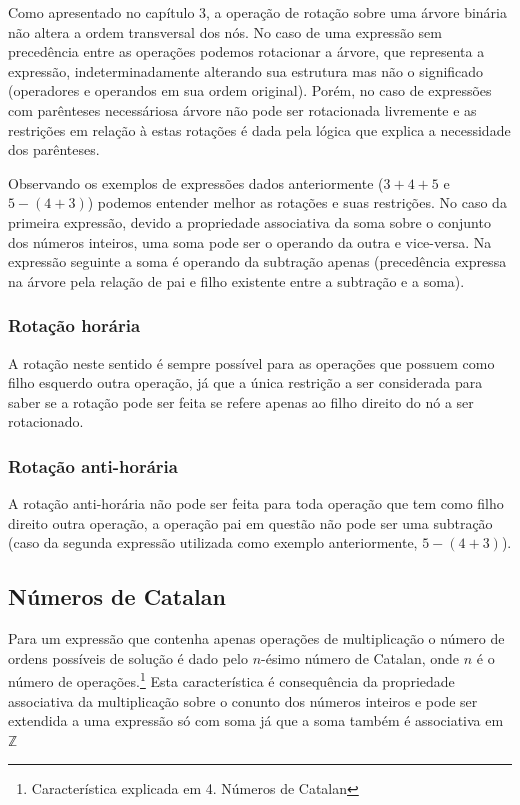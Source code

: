 Como apresentado no capítulo 3, a operação de rotação sobre uma árvore binária não altera a ordem transversal dos nós. No caso de uma expressão sem precedência entre as operações podemos rotacionar a árvore, que representa a expressão, indeterminadamente alterando sua estrutura mas não o significado (operadores e operandos em sua ordem original). Porém, no caso de expressões com parênteses necessáriosa árvore não pode ser rotacionada livremente e as restrições em relação à estas rotações é dada pela lógica que explica a necessidade dos parênteses.

Observando os exemplos de expressões dados anteriormente ($3+4+5$ e $5-(4+3)$) podemos entender melhor as rotações e suas restrições. No caso da primeira expressão, devido a propriedade associativa da soma sobre o conjunto dos números inteiros, uma soma pode ser o operando da outra e vice-versa. Na expressão seguinte a soma é operando da subtração apenas (precedência expressa na árvore pela relação de pai e filho existente entre a subtração e a soma).

\subsubsection{Rotação horária}
	A rotação neste sentido é sempre possível para as operações que possuem como filho esquerdo outra operação, já que a única restrição a ser considerada para saber se a rotação pode ser feita se refere apenas ao filho direito do nó a ser rotacionado.
	
\subsubsection{Rotação anti-horária}
	A rotação anti-horária não pode ser feita para toda operação que tem como filho direito outra operação, a operação pai em questão não pode ser uma subtração (caso da segunda expressão utilizada como exemplo anteriormente, $5-(4+3)$).
	
\subsection{Números de Catalan}
Para um expressão que contenha apenas operações de multiplicação o número de ordens possíveis de solução é dado pelo $n$-ésimo número de Catalan, onde $n$ é o número de operações.\footnote{Característica explicada em 4. Números de Catalan} Esta característica é consequência da propriedade associativa da multiplicação sobre o conunto dos números inteiros e pode ser extendida a uma expressão só com soma já que a soma também é associativa em $\mathbb{Z}$

